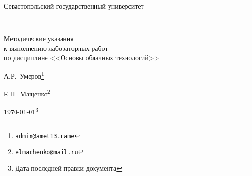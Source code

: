 
\begin{center}
\Large{Севастопольский государственный университет}
\end{center}

{~}\bigskip %

\begin{center}
\Huge{Методические указания \\
к выполнению лабораторных работ \\
по дисциплине <<Основы облачных технологий>>} %

\vspace{1em}
\Large{А.Р.~Умеров}\footnote{\texttt{admin@amet13.name}} %

\Large{Е.Н.~Мащенко}\footnote{\texttt{elmachenko@mail.ru}} %

\Large{\today}\footnote{Дата последней правки документа} %
\end{center}

\clearpage %
